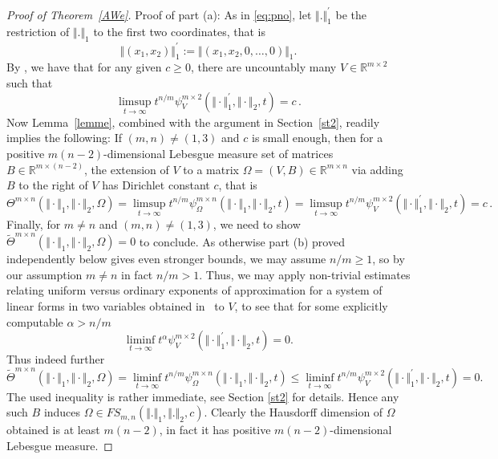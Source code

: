 \documentclass[10pt]{amsart}
\theoremstyle{definition}
\begin{document}
\begin{proof}[Proof of Theorem~\ref{AWe}]
 Proof of part (a): As in \eqref{eq:pno},
 let $\Vert.\Vert_1^{\prime}$ be the restriction of $\Vert.\Vert_1$ to the first two coordinates, that is
 \[
 \Vert (x_1,x_2) \Vert_1^{\prime}:= \Vert (x_1,x_2,0,\ldots,0)\Vert_1.
 \]
 By \cite[Corollary~1]{AginWeiss2024}, we have that for any given $c\ge 0$, there are uncountably many $V\in \mathbb{R}^{m\times 2}$ such that
 \[
   \limsup_{t\to\infty} t^{n/m}\psi_{V}^{m\times 2}(\Vert \cdot \Vert_{1}^{\prime},\Vert \cdot \Vert_{2},t)=c\, .
     \]
     Now Lemma~\ref{lemme}, combined with the argument in Section~\ref{st2}, readily implies the following: If 
     $(m,n)\ne (1,3)$ and
     $c$ is small enough, then 
     for a positive $m(n-2)$-dimensional Lebesgue measure set of matrices $B\in \mathbb{R}^{m\times (n-2)}$,
     the extension of $V$ to a matrix $\Omega=(V,B)\in \mathbb{R}^{m\times n}$
     via adding $B$ to the right of $V$ has Dirichlet constant $c$, that is
        \[
        \Theta^{m\times n}(\Vert\cdot\Vert_1,\Vert\cdot\Vert_2,\Omega)=\limsup_{t\to\infty} t^{n/m}\psi_{\Omega}^{m\times n}(\Vert \cdot \Vert_{1},\Vert \cdot \Vert_{2},t)=
     \limsup_{t\to\infty} t^{n/m}\psi_{V}^{m\times 2}(\Vert \cdot \Vert_{1}^{\prime},\Vert \cdot \Vert_{2},t)=c\, .
     \]
     Finally, for $m\ne n$ and $(m,n)\ne (1,3)$, we need to show $\tilde{\Theta}^{m\times n}(\Vert\cdot\Vert_1,\Vert\cdot\Vert_2,\Omega)=0$ to conclude.
     As otherwise part (b) proved independently below gives even stronger bounds, we may assume $n/m\ge 1$, so by our assumption $m\ne n$ in fact $n/m>1$. Thus,
     we may apply non-trivial estimates relating uniform versus ordinary exponents of approximation
    for a system of linear forms in two variables obtained in~\cite{nikmo} to $V$, to see
     that for some explicitly computable $\alpha>n/m$
     \[
     \liminf_{t\to\infty} t^{\alpha}\psi_{V}^{m\times 2}(\Vert \cdot \Vert_{1}^{\prime},\Vert \cdot \Vert_{2},t)=0.
     \]
     Thus indeed further
       \[
        \tilde{\Theta}^{m\times n}(\Vert\cdot\Vert_1,\Vert\cdot\Vert_2,\Omega)=\liminf_{t\to\infty} t^{n/m}\psi_{\Omega}^{m\times n}(\Vert \cdot \Vert_{1},\Vert \cdot \Vert_{2},t)\le 
     \liminf_{t\to\infty} t^{n/m}\psi_{V}^{m\times 2}(\Vert \cdot \Vert_{1}^{\prime},\Vert \cdot \Vert_{2},t)=0.
     \]
     The used inequality is rather immediate,
     see Section \ref{st2} for details.
     Hence any such $B$ induces $\Omega\in FS_{m,n}(\Vert.\Vert_1, \Vert.\Vert_2,c)$. Clearly the Hausdorff dimension of $\Omega$ obtained is at least $m(n-2)$, in fact it has positive $m(n-2)$-dimensional Lebesgue measure.
 

\end{proof}
\end{document}
